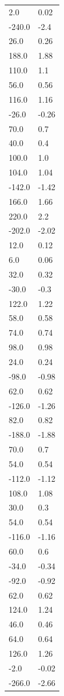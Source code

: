 \begin{longtable}{ll}
2.0 & 0.02 \\
-240.0 & -2.4 \\
26.0 & 0.26 \\
188.0 & 1.88 \\
110.0 & 1.1 \\
56.0 & 0.56 \\
116.0 & 1.16 \\
-26.0 & -0.26 \\
70.0 & 0.7 \\
40.0 & 0.4 \\
100.0 & 1.0 \\
104.0 & 1.04 \\
-142.0 & -1.42 \\
166.0 & 1.66 \\
220.0 & 2.2 \\
-202.0 & -2.02 \\
12.0 & 0.12 \\
6.0 & 0.06 \\
32.0 & 0.32 \\
-30.0 & -0.3 \\
122.0 & 1.22 \\
58.0 & 0.58 \\
74.0 & 0.74 \\
98.0 & 0.98 \\
24.0 & 0.24 \\
-98.0 & -0.98 \\
62.0 & 0.62 \\
-126.0 & -1.26 \\
82.0 & 0.82 \\
-188.0 & -1.88 \\
70.0 & 0.7 \\
54.0 & 0.54 \\
-112.0 & -1.12 \\
108.0 & 1.08 \\
30.0 & 0.3 \\
54.0 & 0.54 \\
-116.0 & -1.16 \\
60.0 & 0.6 \\
-34.0 & -0.34 \\
-92.0 & -0.92 \\
62.0 & 0.62 \\
124.0 & 1.24 \\
46.0 & 0.46 \\
64.0 & 0.64 \\
126.0 & 1.26 \\
-2.0 & -0.02 \\
-266.0 & -2.66 \\

\end{longtable}
